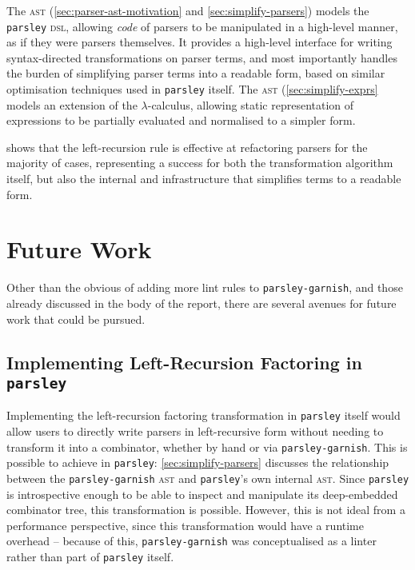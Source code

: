\documentclass[../../main.tex]{subfiles}
\begin{document}
The  \textsc{ast} (\cref{sec:parser-ast-motivation} and \cref{sec:simplify-parsers}) models the \texttt{parsley} \textsc{dsl}, allowing \emph{code} of parsers to be manipulated in a high-level manner, as if they were parsers themselves.
It provides a high-level interface for writing syntax-directed transformations on parser terms, and most importantly handles the burden of simplifying parser terms into a readable form, based on similar optimisation techniques used in \texttt{parsley} itself.
The  \textsc{ast} (\cref{sec:simplify-exprs} models an extension of the $\lambda$-calculus, allowing static representation of expressions to be partially evaluated and normalised to a simpler form.

 shows that the left-recursion rule is effective at refactoring parsers for the majority of cases, representing a success for both the transformation algorithm itself, but also the internal  and  infrastructure that simplifies terms to a readable form.

\section{Future Work}
Other than the obvious of adding more lint rules to \texttt{parsley-garnish}, and those already discussed in the body of the report, there are several avenues for future work that could be pursued.

\subsection{Implementing Left-Recursion Factoring in \texttt{parsley}}
Implementing the left-recursion factoring transformation in \texttt{parsley} itself would allow users to directly write parsers in left-recursive form without needing to transform it into a  combinator, whether by hand or via \texttt{parsley-garnish}.
This is possible to achieve in \texttt{parsley}: \cref{sec:simplify-parsers} discusses the relationship between the \texttt{parsley-garnish}  \textsc{ast} and \texttt{parsley}'s own internal \textsc{ast}.
Since \texttt{parsley} is introspective enough to be able to inspect and manipulate its deep-embedded combinator tree, this transformation is possible.
However, this is not ideal from a performance perspective, since this transformation would have a runtime overhead -- because of this, \texttt{parsley-garnish} was conceptualised as a linter rather than part of \texttt{parsley} itself.
\end{document}
